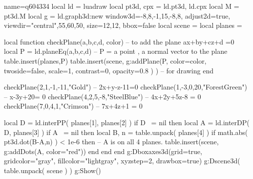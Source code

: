 \documentclass[border=5pt]{standalone}%
\begin{document}
\begin{luadraw}{name=q604334}
local ld = luadraw
local pt3d, cpx = ld.pt3d, ld.cpx
local M = pt3d.M
local g = ld.graph3d:new{ window3d={-8,8,-1,15,-8,8}, adjust2d=true, 
    viewdir={"central",55,60,50}, size={12,12}, bbox=false }
local scene = {}
local planes = {}

local function checkPlane(a,b,c,d, color) -- to add the plane ax+by+cz+d =0
    local P = ld.planeEq(a,b,c,d) -- P = {a point , a normal vector to the plane}
    table.insert(planes,P)
    table.insert(scene, g:addPlane(P, {color=color, twoside=false, scale=1, contrast=0, opacity=0.8 }) ) -- for drawing
end

checkPlane(2,1,-1,-11,"Gold") -- 2x+y-z-11=0
checkPlane(1,-3,0,20,"ForestGreen") -- x-3y+20= 0
checkPlane(4,2,5,-8,"SteelBlue") -- 4x+2y+5z-8 = 0
checkPlane(7,0,4,1,"Crimson") -- 7x+4z+1 = 0

local D = ld.interPP( planes[1], planes[2] )
if D ~= nil then
    local A = ld.interDP( D, planes[3] )
    if A ~= nil then
        local B, n = table.unpack( planes[4] )
        if math.abs( pt3d.dot(B-A,n) ) < 1e-6 then -- A is on all 4 planes.
            table.insert(scene, g:addDots(A, {color="red"})) 
        end
    end
end
g:Dboxaxes3d({grid=true, gridcolor="gray", fillcolor="lightgray", xyzstep=2, drawbox=true})
g:Dscene3d( table.unpack( scene ) )
g:Show()
\end{luadraw}
\end{document}
